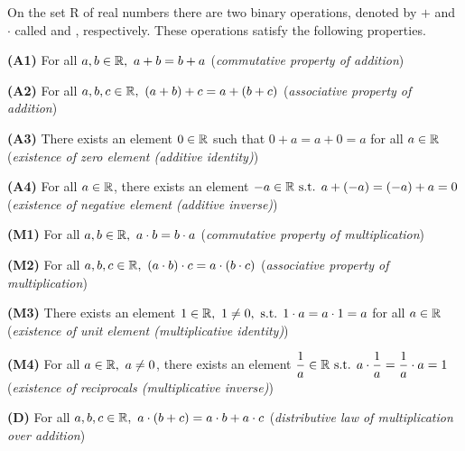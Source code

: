 \documentclass[a4paper,12pt]{article}
\begin{document}
\begin{axiom}
    On the set R of real numbers there are two binary operations, denoted by \(+\) and \(\cdot\) called  and , respectively. 
    These operations satisfy the following properties.


    \textbf{(A1)} For all \(a,b\in\R,\ a+b=b+a\) (\textit{commutative property of addition})

    \textbf{(A2)} For all \(a,b,c\in\R,\ (a+b)+c=a+(b+c)\) (\textit{associative property of addition})

    \textbf{(A3)} There exists an element \(0\in\mathbb{R}\) such that \(0+a=a+0=a\) for all \(a\in\mathbb{R}\)
    \\(\textit{existence of zero element (additive identity)})

    \textbf{(A4)} For all \(a\in\mathbb{R}\), there exists an element \(-a\in\mathbb{R}\text{ s.t. } a+(-a)=(-a)+a=0\) \\
    (\textit{existence of negative element (additive inverse)})


    \textbf{(M1)} For all \(a,b\in\R,\ a\cdot b=b\cdot a\) (\textit{commutative property of multiplication})

    \textbf{(M2)} For all \(a,b,c\in\R,\ (a\cdot b)\cdot c=a\cdot (b\cdot c)\) (\textit{associative property of multiplication})

    \textbf{(M3)} There exists an element \(1\in\mathbb{R},\ 1\neq0,\text{ s.t. } 1\cdot a=a\cdot 1=a\) for all \(a\in\mathbb{R}\) \\(\textit{existence of unit element (multiplicative identity)})

    \textbf{(M4)} For all \(a\in\R,\ a\neq0\), there exists an element \(\dfrac{1}{a}\in\mathbb{R}\text{ s.t. } a\cdot \dfrac{1}{a}=\dfrac{1}{a}\cdot a=1\) \\(\textit{existence of reciprocals (multiplicative inverse)})


    \textbf{(D)} For all \(a,b,c\in\R,\ a\cdot(b+c)=a\cdot b+a\cdot c\) (\textit{distributive law of multiplication over addition})\\

\end{axiom}
\end{document}
